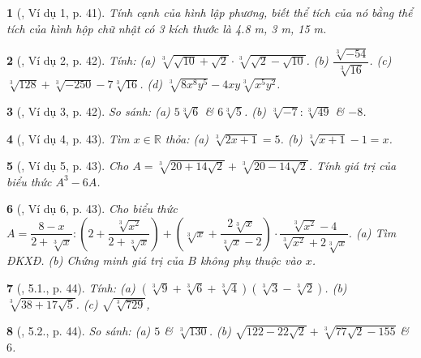 \documentclass{article}
\newtheorem{baitoan}{}
\begin{document}
\begin{baitoan}[\cite{Binh_boi_duong_Toan_9_tap_1}, Ví dụ 1, p. 41]
	Tính cạnh của hình lập phương, biết thể tích của nó bằng thể tích của hình hộp chữ nhật có 3 kích thước là {\rm4.8 m, 3 m, 15 m}.
\end{baitoan}

\begin{baitoan}[\cite{Binh_boi_duong_Toan_9_tap_1}, Ví dụ 2, p. 42]
	Tính: (a) $\sqrt[3]{\sqrt{10} + \sqrt{2}}\cdot\sqrt[3]{\sqrt{2} - \sqrt{10}}$. (b) $\dfrac{\sqrt[3]{-54}}{\sqrt[3]{16}}$. (c) $\sqrt[3]{128} + \sqrt[3]{-250} - 7\sqrt[3]{16}$. (d) $\sqrt[3]{8x^8y^5} - 4xy\sqrt[3]{x^5y^2}$.
\end{baitoan}

\begin{baitoan}[\cite{Binh_boi_duong_Toan_9_tap_1}, Ví dụ 3, p. 42]
	So sánh: (a) $5\sqrt[3]{6}$ \& $6\sqrt[3]{5}$. (b) $\sqrt[3]{-7}:\sqrt[3]{49}$ \& $-8$.
\end{baitoan}

\begin{baitoan}[\cite{Binh_boi_duong_Toan_9_tap_1}, Ví dụ 4, p. 43]
	Tìm $x\in\mathbb{R}$ thỏa: (a) $\sqrt[3]{2x + 1} = 5$. (b) $\sqrt[3]{x + 1} - 1 = x$.
\end{baitoan}

\begin{baitoan}[\cite{Binh_boi_duong_Toan_9_tap_1}, Ví dụ 5, p. 43]
	Cho $A = \sqrt[3]{20 + 14\sqrt{2}} + \sqrt[3]{20 - 14\sqrt{2}}$. Tính giá trị của biểu thức $A^3 - 6A$.
\end{baitoan}

\begin{baitoan}[\cite{Binh_boi_duong_Toan_9_tap_1}, Ví dụ 6, p. 43]
	Cho biểu thức $A = \dfrac{8 - x}{2 + \sqrt[3]{x}}:\left(2 + \dfrac{\sqrt[3]{x^2}}{2 + \sqrt[3]{x}}\right) + \left(\sqrt[3]{x} + \dfrac{2\sqrt[3]{x}}{\sqrt[3]{x} - 2}\right)\cdot\dfrac{\sqrt[3]{x^2} - 4}{\sqrt[3]{x^2} + 2\sqrt[3]{x}}$. (a) Tìm {\rm ĐKXĐ}. (b) Chứng minh giá trị của $B$ không phụ thuộc vào $x$.
\end{baitoan}

\begin{baitoan}[\cite{Binh_boi_duong_Toan_9_tap_1}, 5.1., p. 44]
	Tính: (a) $(\sqrt[3]{9} + \sqrt[3]{6} + \sqrt[3]{4})(\sqrt[3]{3} - \sqrt[3]{2})$. (b) $\sqrt[3]{38 + 17\sqrt{5}}$. (c) $\sqrt{\sqrt[3]{729}}$,
\end{baitoan}

\begin{baitoan}[\cite{Binh_boi_duong_Toan_9_tap_1}, 5.2., p. 44]
	So sánh: (a) $5$ \& $\sqrt[3]{130}$. (b) $\sqrt{122 - 22\sqrt{2}} + \sqrt[3]{77\sqrt{2} - 155}$ \& $6$.
\end{baitoan}
\end{document}
